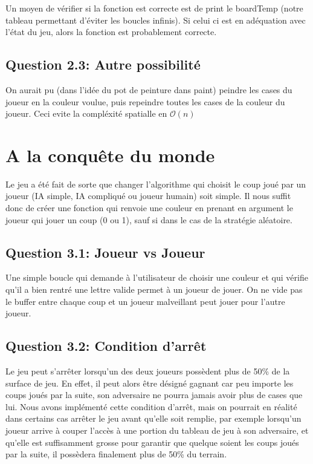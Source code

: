 \documentclass{article}
\begin{document}
    Un moyen de vérifier si la fonction est correcte est de print le boardTemp (notre tableau permettant d'éviter les boucles infinis). Si celui ci est en adéquation avec l'état du jeu, alors la fonction est probablement correcte.

    \subsection*{Question 2.3: Autre possibilité}
    On aurait pu (dans l'idée du pot de peinture dans paint) peindre les cases du joueur en la couleur voulue, puis repeindre toutes les cases de la couleur du joueur. Ceci evite la compléxité spatialle en $\mathcal{O}(n)$

    \section{A la conquête du monde}

    Le jeu a été fait de sorte que changer l'algorithme qui choisit le coup joué par un joueur (IA simple, IA compliqué ou joueur humain) soit simple. Il nous suffit donc de créer une fonction qui renvoie une couleur en prenant en argument le joueur qui jouer un coup (0 ou 1), sauf si dans le cas de la stratégie aléatoire.

    \subsection*{Question 3.1: Joueur vs Joueur}

    Une simple boucle qui demande à l'utilisateur de choisir une couleur et qui vérifie qu'il a bien rentré une lettre valide permet à un joueur de jouer. On ne vide pas le buffer entre chaque coup et un joueur malveillant peut jouer pour l'autre joueur.

    \subsection*{Question 3.2: Condition d'arrêt}

    Le jeu peut s'arrêter lorsqu'un des deux joueurs possèdent plus de 50\% de la surface de jeu. En effet, il peut alors être désigné gagnant car peu importe les coups joués par la suite, son adversaire ne pourra jamais avoir plus de cases que lui. Nous avons implémenté cette condition d'arrêt, mais on pourrait en réalité dans certains cas arrêter le jeu avant qu'elle soit remplie, par exemple lorsqu'un joueur arrive à couper l'accès à une portion du tableau de jeu à son adversaire, et qu'elle est suffisamment grosse pour garantir que quelque soient les coups joués par la suite, il possèdera finalement plus de 50\% du terrain.
\end{document}
